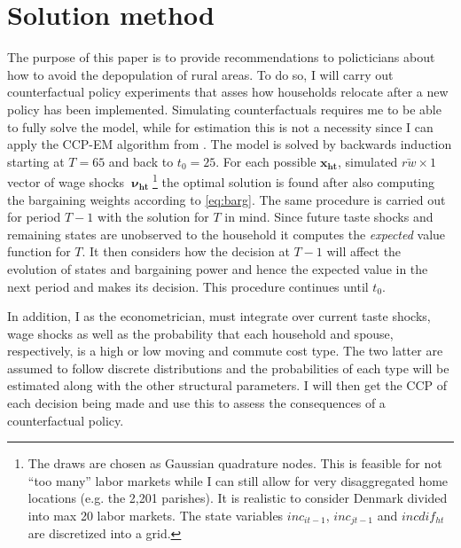 \section{Solution method}
The purpose of this paper is to provide recommendations to policticians about how to avoid the depopulation of rural areas. To do so, I will carry out counterfactual policy experiments that asses how households relocate after a new policy has been implemented. Simulating counterfactuals requires me to be able to fully solve the model, while for estimation this is not a necessity since I can apply the CCP-EM algorithm from \cite{ArcidiaconoMiller2011}. The model is solved by backwards induction starting at $T=65$ and back to $t_0=25$. For each possible $\boldsymbol{x_{ht}}$, simulated $\bar{rw}\times 1$ vector of wage shocks $\boldsymbol{\upnu_{ht}}$\footnote{The draws are chosen as Gaussian quadrature nodes. This is feasible for not ``too many'' labor markets while I can still allow for very disaggregated home locations (e.g. the 2,201 parishes). It is realistic to consider Denmark divided into max 20 labor markets. The state variables $inc_{it-1}$, $inc_{jt-1}$ and $incdif_{ht}$ are discretized into a grid.} the optimal solution is found after also computing the bargaining weights according to \eqref{eq:barg}. The same procedure is carried out for period $T-1$ with the solution for $T$ in mind. Since future taste shocks and remaining states are unobserved to the household it computes the \textit{expected} value function for $T$. It then considers how the decision at $T-1$ will affect the evolution of states and bargaining power and hence the expected value in the next period and makes its decision. This procedure continues until $t_0$.

In addition, I as the econometrician, must integrate over current taste shocks, wage shocks as well as the probability that each household and spouse, respectively, is a high or low moving and commute cost type. The two latter are assumed to follow discrete distributions and the probabilities of each type will be estimated along with the other structural parameters. I will then get the CCP of each decision being made and use this to assess the consequences of a counterfactual policy.




